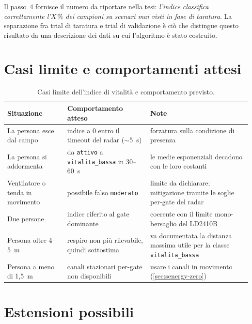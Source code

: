 Il passo~4 fornisce il numero da riportare nella tesi: \emph{l'indice classifica
correttamente l'$X\,\%$ dei campioni su scenari mai visti in fase di taratura}. La
separazione fra trial di taratura e trial di validazione è ciò che distingue questo
risultato da una descrizione dei dati su cui l'algoritmo è stato costruito.


\section{Casi limite e comportamenti attesi}
\label{sec:vitalita-limiti}

\begin{table}[htbp]
\centering
\caption{Casi limite dell'indice di vitalità e comportamento previsto.}
\label{tab:vitalita-casilimite}
\small
\begin{tabularx}{\linewidth}{@{}XXX@{}}
\toprule
\textbf{Situazione} & \textbf{Comportamento atteso} & \textbf{Note} \\
\midrule
La persona esce dal campo & indice a 0 entro il timeout del radar ($\sim$5~s) &
  forzatura sulla condizione di presenza \\
La persona si addormenta & da \texttt{attivo} a \texttt{vitalita\_bassa} in
  30--60~s & le medie esponenziali decadono con le loro costanti \\
Ventilatore o tenda in movimento & possibile falso \texttt{moderato} &
  limite da dichiarare; mitigazione tramite le soglie per-gate del radar \\
Due persone & indice riferito al gate dominante &
  coerente con il limite mono-bersaglio del LD2410B \\
Persona oltre 4--5~m & respiro non più rilevabile, quindi sottostima &
  va documentata la distanza massima utile per la classe
  \texttt{vitalita\_bassa} \\
Persona a meno di 1,5~m & canali stazionari per-gate non disponibili &
  usare i canali in movimento (\cref{sec:senergy-zero}) \\
\bottomrule
\end{tabularx}
\end{table}

\section{Estensioni possibili}

